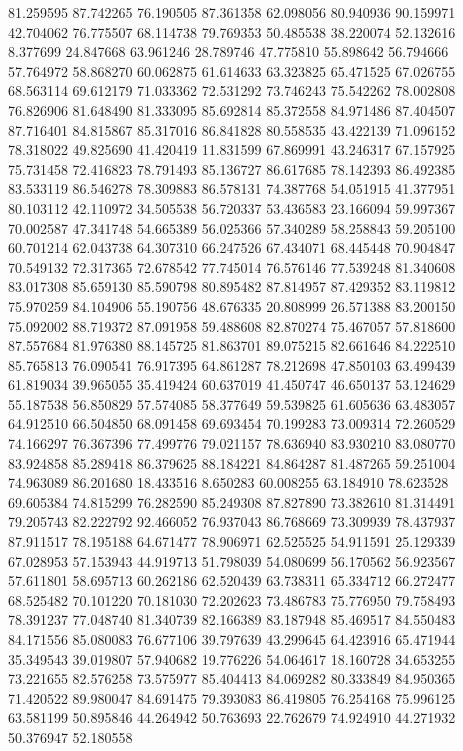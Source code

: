 81.259595
87.742265
76.190505
87.361358
62.098056
80.940936
90.159971
42.704062
76.775507
68.114738
79.769353
50.485538
38.220074
52.132616
8.377699
24.847668
63.961246
28.789746
47.775810
55.898642
56.794666
57.764972
58.868270
60.062875
61.614633
63.323825
65.471525
67.026755
68.563114
69.612179
71.033362
72.531292
73.746243
75.542262
78.002808
76.826906
81.648490
81.333095
85.692814
85.372558
84.971486
87.404507
87.716401
84.815867
85.317016
86.841828
80.558535
43.422139
71.096152
78.318022
49.825690
41.420419
11.831599
67.869991
43.246317
67.157925
75.731458
72.416823
78.791493
85.136727
86.617685
78.142393
86.492385
83.533119
86.546278
78.309883
86.578131
74.387768
54.051915
41.377951
80.103112
42.110972
34.505538
56.720337
53.436583
23.166094
59.997367
70.002587
47.341748
54.665389
56.025366
57.340289
58.258843
59.205100
60.701214
62.043738
64.307310
66.247526
67.434071
68.445448
70.904847
70.549132
72.317365
72.678542
77.745014
76.576146
77.539248
81.340608
83.017308
85.659130
85.590798
80.895482
87.814957
87.429352
83.119812
75.970259
84.104906
55.190756
48.676335
20.808999
26.571388
83.200150
75.092002
88.719372
87.091958
59.488608
82.870274
75.467057
57.818600
87.557684
81.976380
88.145725
81.863701
89.075215
82.661646
84.222510
85.765813
76.090541
76.917395
64.861287
78.212698
47.850103
63.499439
61.819034
39.965055
35.419424
60.637019
41.450747
46.650137
53.124629
55.187538
56.850829
57.574085
58.377649
59.539825
61.605636
63.483057
64.912510
66.504850
68.091458
69.693454
70.199283
73.009314
72.260529
74.166297
76.367396
77.499776
79.021157
78.636940
83.930210
83.080770
83.924858
85.289418
86.379625
88.184221
84.864287
81.487265
59.251004
74.963089
86.201680
18.433516
8.650283
60.008255
63.184910
78.623528
69.605384
74.815299
76.282590
85.249308
87.827890
73.382610
81.314491
79.205743
82.222792
92.466052
76.937043
86.768669
73.309939
78.437937
87.911517
78.195188
64.671477
78.906971
62.525525
54.911591
25.129339
67.028953
57.153943
44.919713
51.798039
54.080699
56.170562
56.923567
57.611801
58.695713
60.262186
62.520439
63.738311
65.334712
66.272477
68.525482
70.101220
70.181030
72.202623
73.486783
75.776950
79.758493
78.391237
77.048740
81.340739
82.166389
83.187948
85.469517
84.550483
84.171556
85.080083
76.677106
39.797639
43.299645
64.423916
65.471944
35.349543
39.019807
57.940682
19.776226
54.064617
18.160728
34.653255
73.221655
82.576258
73.575977
85.404413
84.069282
80.333849
84.950365
71.420522
89.980047
84.691475
79.393083
86.419805
76.254168
75.996125
63.581199
50.895846
44.264942
50.763693
22.762679
74.924910
44.271932
50.376947
52.180558
